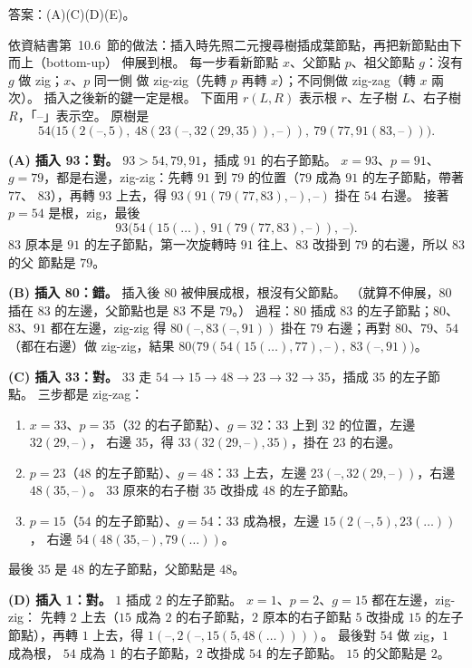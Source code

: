 \begin{pastsoln}
答案：(A)(C)(D)(E)。

依資結書第~10.6~節的做法：插入時先照二元搜尋樹插成葉節點，再把新節點由下而上（bottom-up）
伸展到根。 每一步看新節點 $x$、父節點 $p$、祖父節點 $g$：沒有 $g$ 做 zig；$x$、$p$ 同一側
做 zig-zig（先轉 $p$ 再轉 $x$）；不同側做 zig-zag（轉 $x$ 兩次）。 插入之後新的鍵一定是根。
下面用 $r(L, R)$ 表示根 $r$、左子樹 $L$、右子樹 $R$，「--」表示空。 原樹是
\[
54\bigl(15(2(\text{--}, 5),\ 48(23(\text{--}, 32(29, 35)), \text{--})),\ 79(77, 91(83, \text{--}))\bigr).
\]

\textbf{(A) 插入 93：對。} $93 > 54, 79, 91$，插成 $91$ 的右子節點。 $x = 93$、$p = 91$、
$g = 79$，都是右邊，zig-zig：先轉 $91$ 到 $79$ 的位置（$79$ 成為 $91$ 的左子節點，帶著 $77$、
$83$），再轉 $93$ 上去，得 $93(91(79(77, 83), \text{--}), \text{--})$ 掛在 $54$ 右邊。 接著
$p = 54$ 是根，zig，最後
\[
93\bigl(54(15(\ldots),\ 91(79(77, 83), \text{--})),\ \text{--}\bigr).
\]
$83$ 原本是 $91$ 的左子節點，第一次旋轉時 $91$ 往上、$83$ 改掛到 $79$ 的右邊，所以 $83$ 的父
節點是 $79$。

\textbf{(B) 插入 80：錯。} 插入後 $80$ 被伸展成根，根沒有父節點。 （就算不伸展，$80$ 插在
$83$ 的左邊，父節點也是 $83$ 不是 $79$。） 過程：$80$ 插成 $83$ 的左子節點；$80$、$83$、$91$
都在左邊，zig-zig 得 $80(\text{--}, 83(\text{--}, 91))$ 掛在 $79$ 右邊；再對 $80$、$79$、$54$
（都在右邊）做 zig-zig，結果 $80\bigl(79(54(15(\ldots), 77), \text{--}),\ 83(\text{--}, 91)\bigr)$。

\textbf{(C) 插入 33：對。} $33$ 走 $54 \to 15 \to 48 \to 23 \to 32 \to 35$，插成 $35$ 的左子節點。
三步都是 zig-zag：
\begin{enumerate}
\item $x = 33$、$p = 35$（$32$ 的右子節點）、$g = 32$：$33$ 上到 $32$ 的位置，左邊 $32(29, \text{--})$，
右邊 $35$，得 $33(32(29, \text{--}), 35)$，掛在 $23$ 的右邊。
\item $p = 23$（$48$ 的左子節點）、$g = 48$：$33$ 上去，左邊 $23(\text{--}, 32(29, \text{--}))$，右邊
$48(35, \text{--})$。 $33$ 原來的右子樹 $35$ 改掛成 $48$ 的左子節點。
\item $p = 15$（$54$ 的左子節點）、$g = 54$：$33$ 成為根，左邊 $15(2(\text{--}, 5), 23(\ldots))$，
右邊 $54(48(35, \text{--}), 79(\ldots))$。
\end{enumerate}
最後 $35$ 是 $48$ 的左子節點，父節點是 $48$。

\textbf{(D) 插入 1：對。} $1$ 插成 $2$ 的左子節點。 $x = 1$、$p = 2$、$g = 15$ 都在左邊，zig-zig：
先轉 $2$ 上去（$15$ 成為 $2$ 的右子節點，$2$ 原本的右子節點 $5$ 改掛成 $15$ 的左子節點），再轉
$1$ 上去，得 $1(\text{--}, 2(\text{--}, 15(5, 48(\ldots))))$。 最後對 $54$ 做 zig，$1$ 成為根，
$54$ 成為 $1$ 的右子節點，$2$ 改掛成 $54$ 的左子節點。 $15$ 的父節點是 $2$。


\end{pastsoln}
